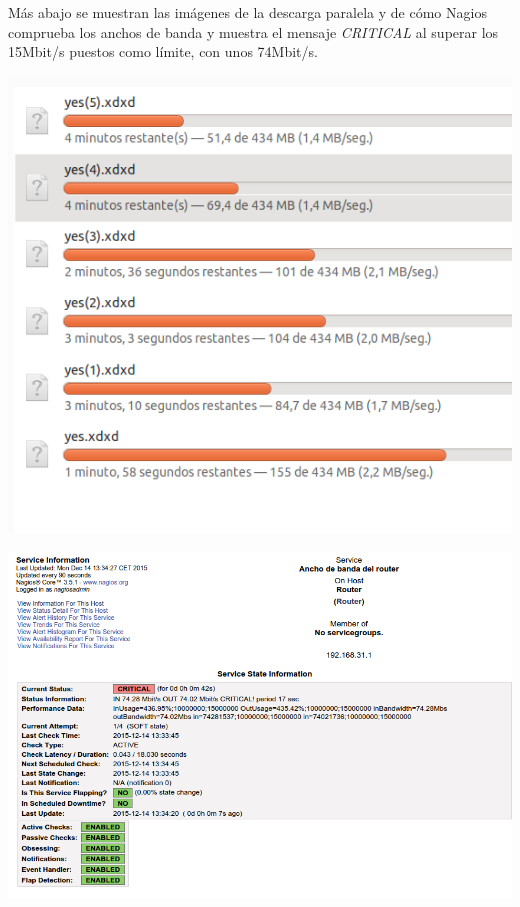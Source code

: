 \documentclass[]{article}
\begin{document}
Más abajo se muestran las imágenes de la descarga paralela y de cómo Nagios comprueba los anchos de banda y muestra el mensaje \textit{CRITICAL} al superar los 15Mbit/s puestos como límite, con unos 74Mbit/s.

\begin{center}
	\includegraphics[scale=0.5]{images/snmp/nagios/descargas.png}
\end{center}
\begin{center}
	\includegraphics[scale=0.5]{images/snmp/nagios/criticalbandwidth.png}
\end{center}
\end{document}
